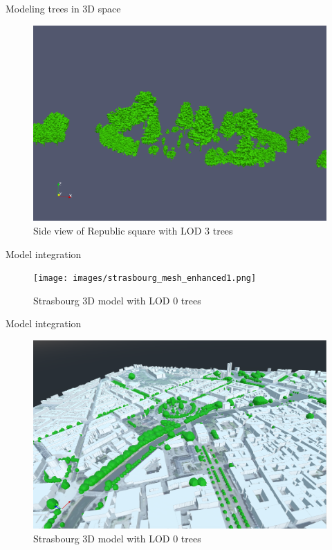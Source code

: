 \documentclass[12pt]{beamer}
\begin{document}
\begin{frame}{Modeling trees in 3D space}
  \begin{figure}[H]
    \centering
    \includegraphics[width=1\textwidth]{images/republic_lod3_side.png}
    \caption{Side view of Republic square with LOD 3 trees}
\end{figure}
\end{frame}

\begin{frame}{Model integration}
  \begin{figure}[H]
    \centering
    \texttt{[image: images/strasbourg\_mesh\_enhanced1.png]}
    \caption{Strasbourg 3D model with LOD 0 trees}
\end{figure}
\end{frame}

\begin{frame}{Model integration}
  \begin{figure}[H]
    \centering
    \includegraphics[width=1\textwidth]{images/strasbourg_mesh_enhanced2.png}
    \caption{Strasbourg 3D model with LOD 0 trees}
\end{figure}
\end{frame}
\end{document}
